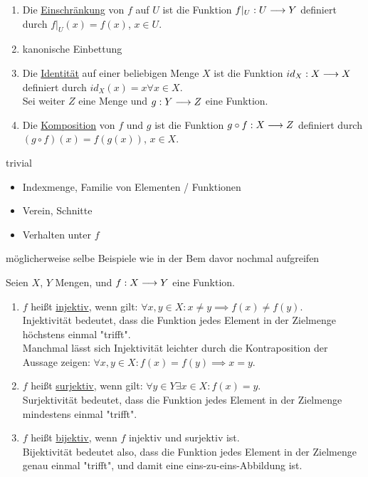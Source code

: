\begin{definition}
    \begin{enumerate}
        \item Die \underline{Einschränkung} von $f$ auf $U$ ist die Funktion $f|_U: U \longrightarrow Y$ definiert durch $f|_U(x) = f(x)$, $x \in U$.
        \item kanonische Einbettung
        \item Die \underline{Identität} auf einer beliebigen Menge $X$ ist die Funktion $id_X: X \longrightarrow X$ definiert durch $id_X(x) = x \forall x \in X$.\\
        Sei weiter $Z$ eine Menge und $g: Y \longrightarrow Z$ eine Funktion.
        \item Die \underline{Komposition} von $f$ und $g$ ist die Funktion $g \circ f: X \longrightarrow Z$ definiert durch $(g \circ f)(x) = f(g(x))$, $x \in X$.
    \end{enumerate}
\end{definition}

\begin{lemma}
    trivial
\end{lemma}

\begin{itemize}
    \item Indexmenge, Familie von Elementen / Funktionen
    \item Verein, Schnitte
    \item Verhalten unter $f$
\end{itemize}

\begin{example}
    möglicherweise selbe Beispiele wie in der Bem davor nochmal aufgreifen
\end{example}

\begin{definition}
    \label{def-injective-surjective-bijective}
    Seien $X$, $Y$ Mengen, und $f: X \longrightarrow Y$ eine Funktion.
    \begin{enumerate}
        \item $f$ heißt \underline{injektiv}, wenn gilt: $\forall x, y \in X: x \neq y \implies f(x) \neq f(y)$.\\
        Injektivität bedeutet, dass die Funktion jedes Element in der Zielmenge höchstens einmal "trifft".\\
        Manchmal lässt sich Injektivität leichter durch die Kontraposition der Aussage zeigen: $\forall x, y \in X: f(x) = f(y) \implies x = y$.
        \item $f$ heißt \underline{surjektiv}, wenn gilt: $\forall y \in Y \exists x \in X: f(x) = y$.\\
        Surjektivität bedeutet, dass die Funktion jedes Element in der Zielmenge mindestens einmal "trifft".
        \item $f$ heißt \underline{bijektiv}, wenn $f$ injektiv und surjektiv ist.\\
        Bijektivität bedeutet also, dass die Funktion jedes Element in der Zielmenge genau einmal "trifft", und damit eine eins-zu-eins-Abbildung ist.
    \end{enumerate}
\end{definition}

